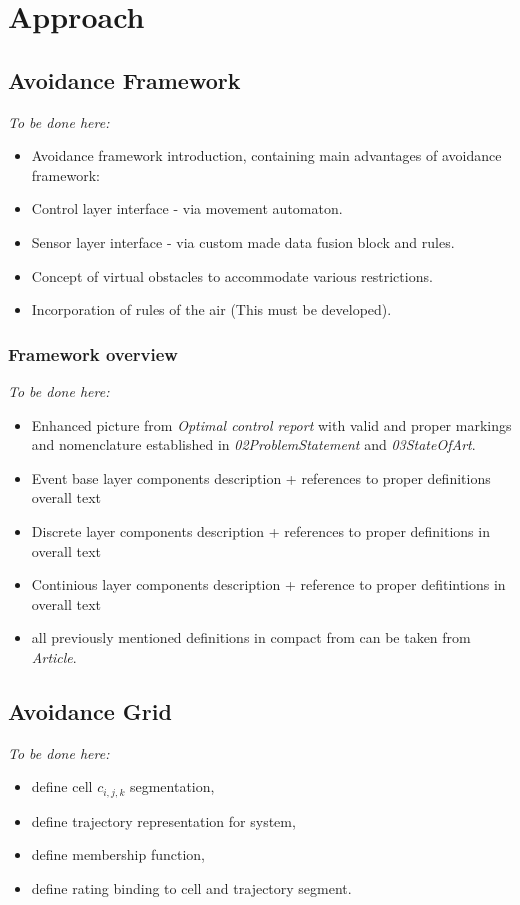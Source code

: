 \chapter{Approach}

\section{Avoidance Framework}\label{s:AvoidanceFramework}
    \emph{To be done here:}
    \begin{itemize}
        \item Avoidance framework introduction, containing main advantages of avoidance framework:
        \item Control layer interface - via movement automaton.
        \item Sensor layer interface  - via custom made data fusion block and rules.
        \item Concept of virtual obstacles to accommodate various restrictions.
        \item Incorporation of rules of the air (This must be developed).
    \end{itemize}
        
\subsection{Framework overview}\label{s:FrameworkOverview}
    \emph{To be done here:}
    \begin{itemize}
        \item Enhanced picture from \emph{Optimal control report} with valid and proper markings and nomenclature established in \emph{02ProblemStatement} and \emph{03StateOfArt}.
        \item Event base layer components description + references to proper definitions overall text
        \item Discrete layer components description + references to proper definitions in overall text
        \item Continious layer components description + reference to proper defitintions in overall text
        \item all previously mentioned definitions in compact from can be taken from \emph{Article}.
    \end{itemize}
    
\section{Avoidance Grid}\label{s:AvoidanceGrid}
    \emph{To be done here:}
    \begin{itemize}
        \item define cell $c_{i,j,k}$ segmentation,
        \item define trajectory representation for system,
        \item define membership function,
        \item define rating binding to cell and trajectory segment.
    \end{itemize}
    
